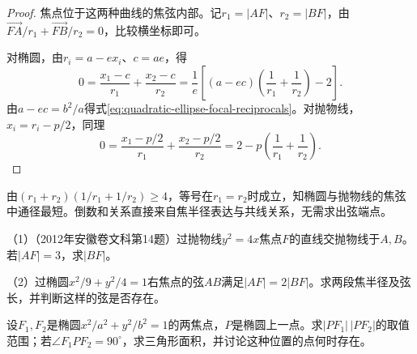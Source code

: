 \begin{proof}
焦点位于这两种曲线的焦弦内部。记\(r_1=|AF|\)、\(r_2=|BF|\)，由\(\overrightarrow{FA}/r_1+\overrightarrow{FB}/r_2=0\)，比较横坐标即可。

对椭圆，由\(r_i=a-ex_i\)、\(c=ae\)，得
\begin{equation*}
    0=\frac{x_1-c}{r_1}+\frac{x_2-c}{r_2}
     =\frac1e\left[\left(a-ec\right)\left(\frac1{r_1}+\frac1{r_2}\right)-2\right] .
\end{equation*}
由\(a-ec=b^2/a\)得式\eqref{eq:quadratic-ellipse-focal-reciprocals}。对抛物线，\(x_i=r_i-p/2\)，同理
\begin{equation*}
    0=\frac{x_1-p/2}{r_1}+\frac{x_2-p/2}{r_2}
     =2-p\left(\frac1{r_1}+\frac1{r_2}\right) .
\end{equation*}
\end{proof}

由\((r_1+r_2)(1/r_1+1/r_2)\ge4\)，等号在\(r_1=r_2\)时成立，知椭圆与抛物线的焦弦中通径最短。倒数和关系直接来自焦半径表达与共线关系，无需求出弦端点。

\begin{samepage}
\begin{example}
\begin{samepage}
（1）（2012年安徽卷文科第14题）过抛物线\(y^2=4x\)焦点\(F\)的直线交抛物线于\(A,B\)。若\(|AF|=3\)，求\(|BF|\)。
\par
\end{samepage}

\begin{samepage}
（2）过椭圆\(x^2/9+y^2/4=1\)右焦点的弦\(AB\)满足\(|AF|=2|BF|\)。求两段焦半径及弦长，并判断这样的弦是否存在。
\par
\end{samepage}
\end{example}
\end{samepage}

\begin{samepage}
\begin{example}
设\(F_1,F_2\)是椭圆\(x^2/a^2+y^2/b^2=1\)的两焦点，\(P\)是椭圆上一点。求\(|PF_1|\,|PF_2|\)的取值范围；若\(\angle F_1PF_2=90^\circ\)，求三角形面积，并讨论这种位置的点何时存在。
\end{example}
\end{samepage}

